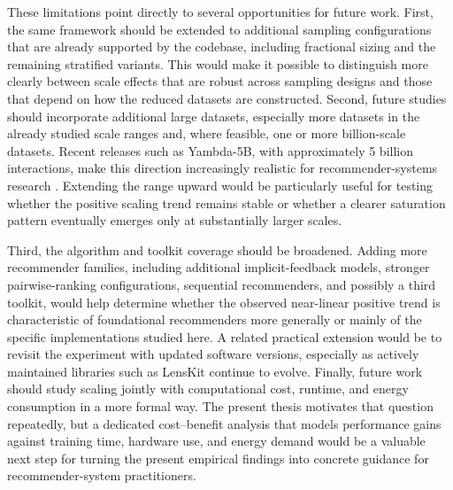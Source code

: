 \documentclass[12pt,a4paper]{article}
\begin{document}
These limitations point directly to several opportunities for future work. First, the same framework should be extended to additional sampling configurations that are already supported by the codebase, including fractional sizing and the remaining stratified variants. This would make it possible to distinguish more clearly between scale effects that are robust across sampling designs and those that depend on how the reduced datasets are constructed. Second, future studies should incorporate additional large datasets, especially more datasets in the already studied scale ranges and, where feasible, one or more billion-scale datasets. Recent releases such as Yambda-5B, with approximately 5 billion interactions, make this direction increasingly realistic for recommender-systems research \cite{yambda5b}. Extending the range upward would be particularly useful for testing whether the positive scaling trend remains stable or whether a clearer saturation pattern eventually emerges only at substantially larger scales.

Third, the algorithm and toolkit coverage should be broadened. Adding more recommender families, including additional implicit-feedback models, stronger pairwise-ranking configurations, sequential recommenders, and possibly a third toolkit, would help determine whether the observed near-linear positive trend is characteristic of foundational recommenders more generally or mainly of the specific implementations studied here. A related practical extension would be to revisit the experiment with updated software versions, especially as actively maintained libraries such as LensKit continue to evolve. Finally, future work should study scaling jointly with computational cost, runtime, and energy consumption in a more formal way. The present thesis motivates that question repeatedly, but a dedicated cost--benefit analysis that models performance gains against training time, hardware use, and energy demand would be a valuable next step for turning the present empirical findings into concrete guidance for recommender-system practitioners.


\newpage


\end{document}
